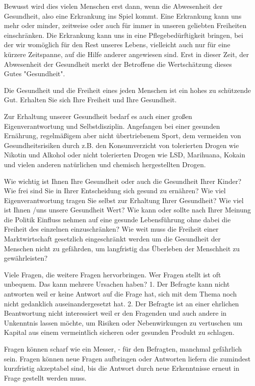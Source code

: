 Bewusst wird dies vielen Menschen erst dann, wenn die Abwesenheit der Gesundheit, also eine Erkrankung ins Spiel kommt. Eine Erkrankung kann uns mehr oder minder, zeitweise oder auch für immer in unseren geliebten Freiheiten einschränken. Die Erkrankung kann uns in eine Pflegebedürftigkeit bringen, bei der wir womöglich für den Rest unseres Lebens, vielleicht auch nur für eine kürzere Zeitspanne, auf die Hilfe anderer angewiesen sind. Erst in dieser Zeit, der Abwesenheit der Gesundheit merkt der Betroffene die Wertschätzung dieses Gutes "Gesundheit".

Die Gesundheit und die Freiheit eines jeden Menschen ist ein hohes zu schützende Gut. Erhalten Sie sich Ihre Freiheit und Ihre Gesundheit.

Zur Erhaltung unserer Gesundheit bedarf es auch einer großen Eigenverantwortung und Selbstdisziplin. Angefangen bei einer gesunden Ernährung, regelmäßigem aber nicht übertriebenem Sport, dem vermeiden von Gesundheitsrisiken durch z.B. den Konsumverzicht von tolerierten Drogen wie Nikotin und Alkohol oder nicht tolerierten Drogen wie LSD, Marihuana, Kokain und vielen anderen natürlichen und chemisch hergestellten Drogen.

Wie wichtig ist Ihnen Ihre Gesundheit oder auch die Gesundheit Ihrer Kinder? Wie frei sind Sie in Ihrer Entscheidung sich gesund zu ernähren? Wie viel Eigenverantwortung tragen Sie selbst zur Erhaltung Ihrer Gesundheit? Wie viel ist Ihnen /uns unsere Gesundheit Wert? Wie kann oder sollte nach Ihrer Meinung die Politik Einfluss nehmen auf eine gesunde Lebensführung ohne dabei die Freiheit des einzelnen einzuschränken? Wie weit muss die Freiheit einer Marktwirtschaft gesetzlich eingeschränkt werden um die Gesundheit der Menschen nicht zu gefährden, um langfristig das Überleben der Menschheit zu gewährleisten?

Viele Fragen, die weitere Fragen hervorbringen. Wer Fragen stellt ist oft unbequem. Das kann mehrere Ursachen haben? 1. Der Befragte kann nicht antworten weil er keine Antwort auf die Frage hat, sich mit dem Thema noch nicht gedanklich auseinandergesetzt hat. 2. Der Befragte ist an einer ehrlichen Beantwortung nicht interessiert weil er den Fragenden und auch andere in Unkenntnis lassen möchte, um Risiken oder Nebenwirkungen zu vertuschen um Kapital aus einem vermeintlich sicheren oder gesunden Produkt zu schlagen.

Fragen können scharf wie ein Messer, - für den Befragten, manchmal gefährlich sein. Fragen können neue Fragen aufbringen oder Antworten liefern die zumindest kurzfristig akzeptabel sind, bis die Antwort durch neue Erkenntnisse erneut in Frage gestellt werden muss.

